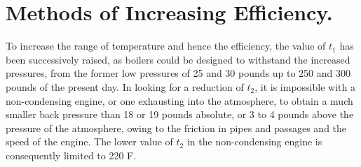 \documentclass[11pt, a5paper]{book}
\begin{document}
\section{Methods of Increasing Efficiency.}To increase the range of
temperature and hence the efficiency, the value of $t_1$ has been
successively raised, as boilers could be designed to withstand the
increased pressures, from the former low pressures of 25 and 30 pounds
up to 250 and 300 pounds of the present day.  In looking for a
reduction of $t_2$, it is impossible with a non-condensing engine, or
one exhausting into the atmosphere, to obtain a much smaller back
pressure than 18 or 19 pounds absolute, or 3 to 4 pounds above the
pressure of the atmosphere, owing to the friction in pipes and
passages and the speed of the engine.  The lower value of $t_2$ in the
non-condensing engine is consequently limited to 220\degree{} F.\par
\end{document}
